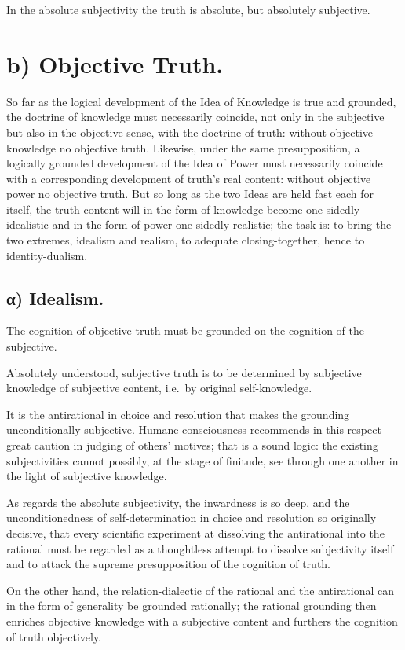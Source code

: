 \documentclass[12pt]{book}
\begin{document}
In the absolute subjectivity the truth is absolute, but absolutely
subjective.

\section*{b) Objective Truth.}

So far as the logical development of the Idea of Knowledge is true
and grounded, the doctrine of knowledge must necessarily coincide,
not only in the subjective but also in the objective sense, with the
doctrine of truth: without objective knowledge no objective truth.
Likewise, under the same presupposition, a logically grounded
development of the Idea of Power must necessarily coincide with a
corresponding development of truth's real content: without objective
power no objective truth. But so long as the two Ideas are held fast
each for itself, the truth-content will in the form of knowledge
become one-sidedly idealistic and in the form of power one-sidedly
realistic; the task is: to bring the two extremes, idealism and
realism, to adequate closing-together, hence to identity-dualism.

\subsection*{α) Idealism.}

The cognition of objective truth must be grounded on the cognition
of the subjective.

Absolutely understood, subjective truth is to be determined by
subjective knowledge of subjective content, i.e.\ by original
self-knowledge.

It is the antirational in choice and resolution that makes the
grounding unconditionally subjective. Humane consciousness
recommends in this respect great caution in judging of others'
motives; that is a sound logic: the existing subjectivities cannot
possibly, at the stage of finitude, see through one another in the
light of subjective knowledge.

As regards the absolute subjectivity, the inwardness is so deep, and
the unconditionedness of self-determination in choice and resolution
so originally decisive, that every scientific experiment at
dissolving the antirational into the rational must be regarded as a
thoughtless attempt to dissolve subjectivity itself and to attack
the supreme presupposition of the cognition of truth.

On the other hand, the relation-dialectic of the rational and the
antirational can in the form of generality be grounded rationally;
the rational grounding then enriches objective knowledge with a
subjective content and furthers the cognition of truth objectively.
\end{document}
